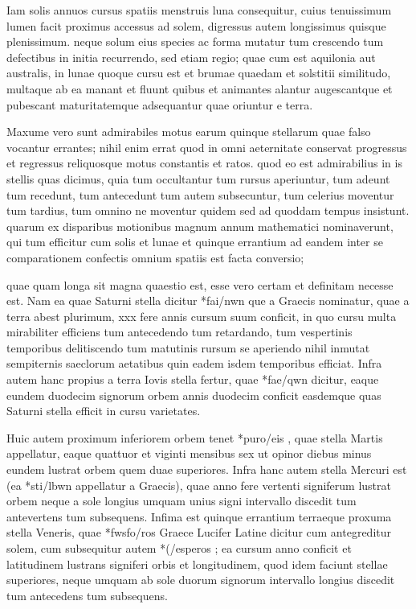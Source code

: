  Iam solis annuos cursus spatiis menstruis luna consequitur, cuius tenuissimum lumen facit proximus accessus ad solem, digressus autem longissimus quisque plenissimum. neque solum eius species ac forma mutatur tum crescendo tum defectibus in initia recurrendo, sed etiam regio; quae cum est aquilonia aut australis, in lunae quoque cursu est et brumae quaedam et solstitii similitudo, multaque ab ea manant et fluunt quibus et animantes alantur augescantque et pubescant maturitatemque adsequantur quae oriuntur e terra.

 Maxume vero sunt admirabiles motus earum quinque stellarum quae falso vocantur errantes; nihil enim errat quod in omni aeternitate conservat progressus et regressus reliquosque motus constantis et ratos. quod eo est admirabilius in is stellis quas dicimus, quia tum occultantur tum rursus aperiuntur, tum adeunt tum recedunt, tum antecedunt tum autem subsecuntur, tum celerius moventur tum tardius, tum omnino ne moventur quidem sed ad quoddam tempus insistunt. quarum ex disparibus motionibus magnum annum mathematici nominaverunt, qui tum efficitur cum solis et lunae et quinque errantium ad eandem inter se comparationem confectis omnium spatiis est facta conversio;

 quae quam longa sit magna quaestio est, esse vero certam et definitam necesse est. Nam ea quae Saturni stella dicitur *fai/nwn que a Graecis nominatur, quae a terra abest plurimum, xxx fere annis cursum suum conficit, in quo cursu multa mirabiliter efficiens tum antecedendo tum retardando, tum vespertinis temporibus delitiscendo tum matutinis rursum se aperiendo nihil inmutat sempiternis saeclorum aetatibus quin eadem isdem temporibus efficiat. Infra autem hanc propius a terra Iovis stella fertur, quae *fae/qwn dicitur, eaque eundem duodecim signorum orbem annis duodecim conficit easdemque quas Saturni stella efficit in cursu varietates.

 Huic autem proximum inferiorem orbem tenet *puro/eis , quae stella Martis appellatur, eaque quattuor et viginti mensibus sex ut opinor diebus minus eundem lustrat orbem quem duae superiores. Infra hanc autem stella Mercuri est (ea *sti/lbwn appellatur a Graecis), quae anno fere vertenti signiferum lustrat orbem neque a sole longius umquam unius signi intervallo discedit tum antevertens tum subsequens. Infima est quinque errantium terraeque proxuma stella Veneris, quae *fwsfo/ros Graece Lucifer Latine dicitur cum antegreditur solem, cum subsequitur autem *(/esperos ; ea cursum anno conficit et latitudinem lustrans signiferi orbis et longitudinem, quod idem faciunt stellae superiores, neque umquam ab sole duorum signorum intervallo longius discedit tum antecedens tum subsequens.

